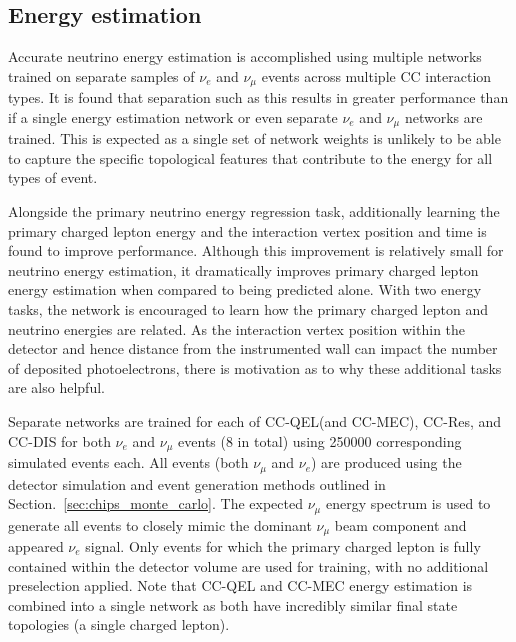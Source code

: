 \subsection{Energy estimation} %
\label{sec:cnn_specific_energy} %

Accurate neutrino energy estimation is accomplished using multiple networks trained on separate
samples of $\nu_{e}$ and $\nu_{\mu}$ events across multiple CC interaction types. It is found that
separation such as this results in greater performance than if a single energy estimation network
or even separate $\nu_{e}$ and $\nu_{\mu}$ networks are trained. This is expected as a single set
of network weights is unlikely to be able to capture the specific topological features that
contribute to the energy for all types of event.

Alongside the primary neutrino energy regression task, additionally learning the primary charged
lepton energy and the interaction vertex position and time is found to improve performance.
Although this improvement is relatively small for neutrino energy estimation, it dramatically
improves primary charged lepton energy estimation when compared to being predicted alone. With two
energy tasks, the network is encouraged to learn how the primary charged lepton and neutrino
energies are related. As the interaction vertex position within the detector and hence distance
from the instrumented wall can impact the number of deposited photoelectrons, there is motivation
as to why these additional tasks are also helpful.

Separate networks are trained for each of CC-QEL(and CC-MEC), CC-Res, and CC-DIS for both
$\nu_{e}$ and $\nu_{\mu}$ events (8 in total) using 250000 corresponding simulated events each.
All events (both $\nu_{\mu}$ and $\nu_{e}$) are produced using the detector simulation and event
generation methods outlined in Section.~\ref{sec:chips_monte_carlo}. The expected \chipsfive
$\nu_{\mu}$ energy spectrum is used to generate all events to closely mimic the dominant
$\nu_{\mu}$ beam component and appeared $\nu_{e}$ signal. Only events for which the primary
charged lepton is fully contained within the detector volume are used for training, with no
additional preselection applied. Note that CC-QEL and CC-MEC energy estimation is combined into a
single network as both have incredibly similar final state topologies (a single charged lepton).

